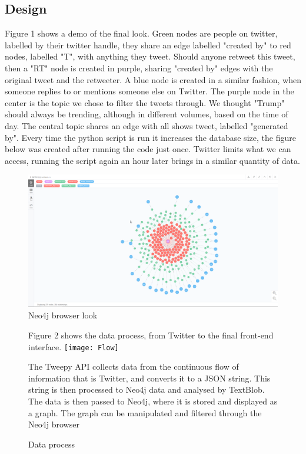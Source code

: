 \documentclass[11pt]{article}
\begin{document}
\subsection{Design}
Figure 1 shows a demo of the final look.\newline
 Green nodes are people on twitter, labelled by their twitter handle, they share an edge labelled "created by" to red nodes, labelled "T", with anything they tweet. Should anyone retweet this tweet, then a "RT" node is created in purple, sharing "created by" edges with the original tweet and the retweeter. A blue node is created in a similar fashion, when someone replies to or mentions someone else on Twitter.\newline
 The purple node in the center is the topic we chose to filter the tweets through. We thought "Trump" should always be trending, although in different volumes, based on the time of day. The central topic shares an edge with all shows tweet, labelled "generated by". \newline
Every time the python script is run it increases the database size, the figure below was created after running the code just once. Twitter limits what we can access, running the script again an hour later brings in a similar quantity of data. 
\begin{figure}
\includegraphics[width=\textwidth]{Neo2}
\caption{Neo4j browser look} 
\label{fig: 1}
\end{figure}

\begin{figure}
Figure 2 shows the data process, from Twitter to the final front-end interface.\newline
\newline
\texttt{[image: Flow]}\newline
\caption{Data process} 
\label{fig: 2}
The Tweepy API collects data from the continuous flow of information that is Twitter, and converts it to a JSON string. This string is then processed to Neo4j data and analysed by TextBlob. The data is then passed to Neo4j, where it is stored and displayed as a graph. The graph can be manipulated and filtered through the Neo4j browser
\end{figure}
\end{document}
